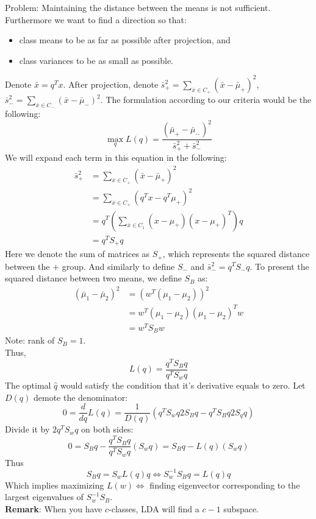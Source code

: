 \noindent Problem: Maintaining the distance between the means is not
sufficient. Furthermore we want to find a direction so that: 
\begin{itemize}
\item class means to be as far as possible after projection, and
\item class variances to be as small as possible.
\end{itemize}
Denote $\bar{x} = q^Tx$. After projection, denote $\bar{s}_{+}^2 = \sum_{\bar{x}\in C_{+}}
(\bar{x}-\bar{\mu}_{+})^2$, $\bar{s}_{-}^2 = \sum_{\bar{x}\in C_{-}}
(\bar{x}-\bar{\mu}_{-})^2$. The formulation according to our criteria
would be the following: 
\[
\max_{q} L(q)=\frac{(\bar{\mu}_{+} - \bar{\mu}_{-})^2}{\bar{s}_{+}^2+\bar{s}_{-}^2}
\]
We will expand each term in this equation in the following:
\begin{align*}
\bar{s}_{+}^2
&= \sum_{\bar{x}\in C_{+}} (\bar{x}-\bar{\mu}_{+})^2\\
&= \sum_{\bar{x}\in C_{+}} (q^Tx-q^T\mu_{+})^2\\
&= q^T\left (\sum_{\bar{x}\in C_1} (x-\mu_{+})(x-\mu_{+})^T \right ) q\\
&= q^TS_{+}q 
\end{align*}
Here we denote the sum of matrices as $S_{+}$, which represents the squared distance between the $+$ group. And similarly to define $S_{-}$ and $\bar{s}^2_{-} = q^TS_{-}q$. To present the squared distance between two means, we define $S_B$ as:
\begin{align*}
(\bar{\mu}_1-\bar{\mu}_2)^2
&= (w^T (\mu_1 - \mu_2))^2\\
&= w^T(\mu_1-\mu_2)(\mu_1-\mu_2)^Tw\\
&= w^TS_Bw 
\end{align*}
Note: rank of $S_B = 1$.\\
Thus,
\[
L(q)=\frac{q^T S_B q}{q^T S_w q}
\]
The optimal $\hat{q}$ would satisfy the condition that it's derivative equals to zero.  Let $D(q)$ demote the denominator:
\[
0 = \frac{d}{dq}L(q)=\frac{1}{D(q)} \left(q^TS_w q2S_B q - q^T S_B q 2 S_q q \right)
\]
Divide it by $2q^TS_wq$ on both sides:
\[
0 = S_Bq - \frac{q^T S_B q}{q^T S_w q} (S_w q)=S_Bq - L(q)(S_w q)
\]
Thus
\[
S_B q = S_w L(q) q \Leftrightarrow S_w^{-1} S_B q = L(q) q
\]
Which implies maximizing $L(w) \Leftrightarrow$ finding eigenvector corresponding to
the largest eigenvalues of $S_w^{-1} S_B$.\\ 

\noindent \textbf{Remark}: When you have $c$-classes, LDA will find a
$c-1$ subspace. 

